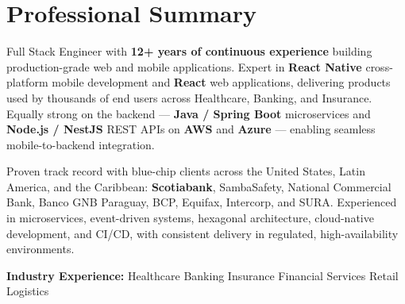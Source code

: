 
\section{Professional Summary}

Full Stack Engineer with \textbf{12+ years of continuous experience} building production-grade web
and mobile applications. Expert in \textbf{React Native} cross-platform mobile development and
\textbf{React} web applications, delivering products used by thousands of end users across
Healthcare, Banking, and Insurance. Equally strong on the backend --- \textbf{Java / Spring Boot}
microservices and \textbf{Node.js / NestJS} REST APIs on \textbf{AWS} and \textbf{Azure} ---
enabling seamless mobile-to-backend integration.

\vspace{3pt}

Proven track record with blue-chip clients across the United States, Latin America, and the
Caribbean: \textbf{Scotiabank}, SambaSafety, National Commercial Bank, Banco GNB Paraguay, BCP,
Equifax, Intercorp, and SURA. Experienced in microservices, event-driven systems, hexagonal
architecture, cloud-native development, and CI/CD, with consistent delivery in regulated,
high-availability environments.

\vspace{4pt}
{\small\color{cvMuted}%
  \textbf{Industry Experience:}\enspace%
  Healthcare\enspace\textbar\enspace
  Banking\enspace\textbar\enspace
  Insurance\enspace\textbar\enspace
  Financial Services\enspace\textbar\enspace
  Retail\enspace\textbar\enspace
  Logistics%
}
